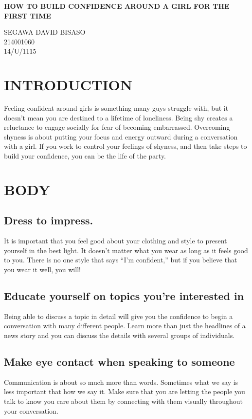 \documentclass[12pt]{article}
\begin{document}
\begin{titlepage}
\begin{center}
\huge{\bfseries HOW TO BUILD CONFIDENCE AROUND A GIRL FOR THE FIRST TIME}\\
\end{center}
\begin{flushright}
\textsc{\LARGE SEGAWA DAVID BISASO\\
214001060\\
14/U/1115\\}
\end{flushright}
\end{titlepage}
\section{INTRODUCTION}
Feeling confident around girls is something many guys struggle with, but it doesn’t mean you are destined to a lifetime of loneliness. Being shy creates a reluctance to engage socially for fear of becoming embarrassed. Overcoming shyness is about putting your focus and energy outward during a conversation with a girl. If you work to control your feelings of shyness, and then take steps to build your confidence, you can be the life of the party.
\section{BODY}
\subsection{Dress to impress.}
It is important that you feel good about your clothing and style to present yourself in the best light. It doesn’t matter what you wear as long as it feels good to you. There is no one style that says “I’m confident,” but if you believe that you wear it well, you will!
\subsection{Educate yourself on topics you’re interested in}
Being able to discuss a topic in detail will give you the confidence to begin a conversation with many different people. Learn more than just the headlines of a news story and you can discuss the details with several groups of individuals.
\subsection{Make eye contact when speaking to someone}
Communication is about so much more than words. Sometimes what we say is less important that how we say it. Make sure that you are letting the people you talk to know you care about them by connecting with them visually throughout your conversation.
\end{document}
